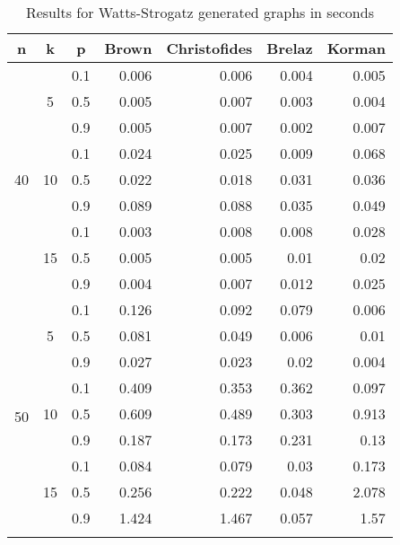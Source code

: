 \begin{table}
\caption{Results for Watts-Strogatz generated graphs in seconds}
\label{tab:tab3}
\setlength{\tabcolsep}{1em} %
\renewcommand{\arraystretch}{1.1}%
\centering
\begin{tabular}{|c|c|c|rrrr|}
\hline
n & k & p & \multicolumn{1}{l|}{Brown} & \multicolumn{1}{l|}{Christofides} & \multicolumn{1}{l|}{Brelaz} & \multicolumn{1}{l|}{Korman} \\ \hline
\multicolumn{1}{|c|}{\multirow{9}{*}{40}} & 
\multicolumn{1}{c|}{\multirow{3}{*}{5}} & 0.1 & 0.006 & 0.006 & 0.004 & 0.005 \\
\multicolumn{1}{|c|}{} & \multicolumn{1}{c|}{} &0.5 & 0.005 & 0.007 & 0.003 & 0.004 \\
\multicolumn{1}{|c|}{} & \multicolumn{1}{c|}{} & 0.9 & 0.005 & 0.007 & 0.002 & 0.007 \\ \cline{2-7} 
\multicolumn{1}{|c|}{} & \multicolumn{1}{c|}{\multirow{3}{*}{10}} & 0.1 & 0.024 & 0.025 & 0.009 & 0.068 \\
\multicolumn{1}{|c|}{} & \multicolumn{1}{c|}{} & 0.5 & 0.022 & 0.018 & 0.031 & 0.036 \\
\multicolumn{1}{|c|}{} & \multicolumn{1}{c|}{} & 0.9 & 0.089 & 0.088 & 0.035 & 0.049 \\ \cline{2-7} 
\multicolumn{1}{|c|}{} & \multicolumn{1}{c|}{\multirow{3}{*}{15}} & 0.1 & 0.003 & 0.008 & 0.008 & 0.028 \\
\multicolumn{1}{|c|}{} & \multicolumn{1}{c|}{} & 0.5 & 0.005 & 0.005 & 0.01 & 0.02 \\
\multicolumn{1}{|c|}{} & \multicolumn{1}{c|}{} & 0.9 & 0.004 & 0.007 & 0.012 & 0.025\\ \hline
\multirow{12}{*}{50} & \multirow{3}{*}{5} & 0.1 & 0.126 & 0.092 & 0.079 & 0.006 \\
 &  & 0.5 & 0.081 & 0.049 & 0.006 & 0.01 \\
 &  & 0.9 & 0.027 & 0.023 & 0.02 & 0.004 \\ \cline{2-7} 
 & \multirow{3}{*}{10} & 0.1 & 0.409 & 0.353 & 0.362 & 0.097 \\
 &  & 0.5 & 0.609 & 0.489 & 0.303 & 0.913 \\
 &  & 0.9 & 0.187 & 0.173 & 0.231 & 0.13 \\ \cline{2-7} 
 & \multirow{3}{*}{15} & 0.1 & 0.084 & 0.079 & 0.03 & 0.173 \\
 &  & 0.5 & 0.256 & 0.222 & 0.048 & 2.078 \\
 &  & 0.9 & 1.424 & 1.467 & 0.057 & 1.57 \\ \cline{2-7} 

\end{tabular}
\end{table}
